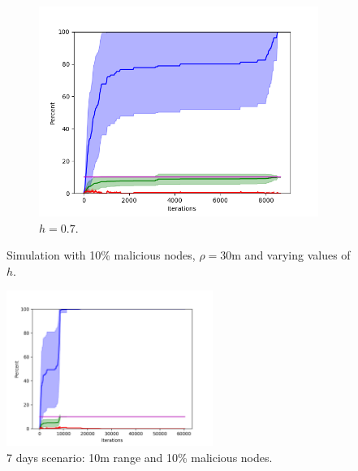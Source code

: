 \begin{figure}
\begin{subfigure}{0.6\textwidth}
\includegraphics[width=\linewidth]{images/plots/thresholds/07_30_10}
\caption{$h = 0.7$.} \label{fig:threshold07}
\end{subfigure}

\caption{Simulation with 10\% malicious nodes, $\rho = 30$m and varying values of $h$.}
\label{fig:randomthresholds}
\end{figure}


\begin{figure}
\centering
\includegraphics[width=0.6\textwidth]{images/plots/Network_rA7/10_10}
\caption{7 days scenario: 10m range and 10\% malicious nodes.} \label{fig:random7}
\end{figure}


